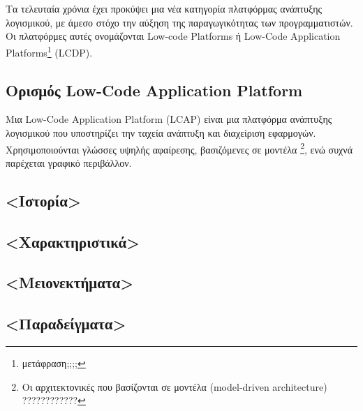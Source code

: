 \chapter{}
    Τα τελευταία χρόνια έχει προκύψει μια νέα κατηγορία πλατφόρμας ανάπτυξης λογισμικού, με άμεσο στόχο την αύξηση της παραγωγικότητας των προγραμματιστών.
    Οι πλατφόρμες αυτές ονομάζονται Low-code Platforms ή Low-Code Application Platforms\footnote{μετάφραση;;;;} (LCDP). \cite{Bock2021}

    \section{Ορισμός Low-Code Application Platform}

        Μια Low-Code Application Platform (LCAP) είναι μια πλατφόρμα ανάπτυξης λογισμικού που υποστηρίζει την ταχεία ανάπτυξη και διαχείριση εφαρμογών.
            Χρησιμοποιούνται γλώσσες υψηλής αφαίρεσης, βασιζόμενες σε μοντέλα \footnote{Οι αρχιτεκτονικές που βασίζονται σε μοντέλα (model-driven architecture) ????????????}, ενώ συχνά παρέχεται γραφικό περιβάλλον.

    \section{<Ιστορία>}

    \section{<Χαρακτηριστικά>}

    \section{<Μειονεκτήματα>}

    \section{<Παραδείγματα>}
